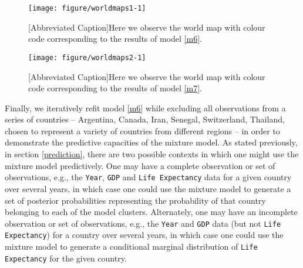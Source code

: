 \documentclass[10pt]{olplainarticle}\usepackage[]{graphicx}\usepackage[]{color}
\makeatletter
\def\maxwidth{ %
  \ifdim\Gin@nat@width>\linewidth
    \linewidth
  \else
    \Gin@nat@width
  \fi
}
\newenvironment{knitrout}{}{} %
\makeatother
\begin{document}
\begin{figure}[H]
\begin{knitrout}
\color{fgcolor}

{\centering \texttt{[image: figure/worldmaps1-1]} 

}



\end{knitrout}
[Abbreviated Caption]{Here we observe the world map with colour code corresponding to the results of model \ref{m6}.}
\end{figure}

\begin{figure}[H]
\begin{knitrout}
\color{fgcolor}

{\centering \texttt{[image: figure/worldmaps2-1]} 

}



\end{knitrout}
[Abbreviated Caption]{Here we observe the world map with colour code corresponding to the results of model \ref{m7}.}
\end{figure}


Finally, we iteratively refit model \ref{m6} while excluding all observations from a series of countries -- Argentina, Canada, Iran, Senegal, Switzerland, Thailand, chosen to represent a variety of countries from different regions -- in order to demonstrate the predictive capacities of the mixture model. As stated previously, in section \ref{prediction}, there are two possible contexts in which one might use the mixture model predictively. One may have a complete observation or set of observations, e.g., the \texttt{Year}, \texttt{GDP} and \texttt{Life Expectancy} data for a given country over several years, in which case one could use the mixture model to generate a set of posterior probabilities representing the probability of that country belonging to each of the model clusters. Alternately, one may have an incomplete observation or set of observations, e.g., the \texttt{Year} and \texttt{GDP} data (but not \texttt{Life Expectancy}) for a country over several years, in which case one could use the mixture model to generate a conditional marginal distribution of \texttt{Life Expectancy} for the given country.
\end{document}
